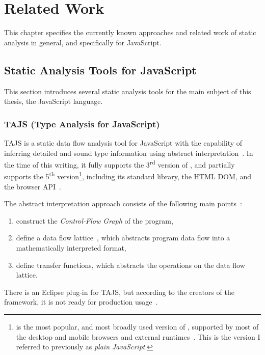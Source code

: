 \chapter{Related Work}
\label{chapter:relatedwork}

This chapter specifies the currently known approaches and related work of static analysis in general, and specifically for JavaScript.


\section{Static Analysis Tools for JavaScript}

This section introduces several static analysis tools for the main subject of this thesis, the JavaScript language.


\subsection{TAJS (Type Analysis for JavaScript)}

TAJS is a static data flow analysis tool for JavaScript with the capability of inferring detailed and sound type information using abstract interpretation~\cite{jensen2009type}. In the time of this writing, it fully supports the 3\textsuperscript{rd} version of \es, and partially supports the 5\textsuperscript{th} version\footnote{ is the most popular, and most broadly used version of \es, supported by most of the desktop and mobile browsers and external runtimes~\cite{kangax-es5}. This is the \es version I referred to previously as \emph{plain JavaScript}.}, including its standard library, the HTML DOM, and the browser API~\cite{tajs-github}.

The abstract interpretation approach consists of the following main points~\cite{tajs-presentation}:

\begin{enumerate}
\item construct the \emph{Control-Flow Graph} of the program,
\item define a data flow lattice~\cite{jensen2009type}, which abstracts program data flow into a mathematically interpreted format,
\item define transfer functions, which abstracts the operations on the data flow lattice.
\end{enumerate}

There is an Eclipse plug-in for TAJS, but according to the creators of the framework, it is not ready for production usage~\cite{tajs-website}.


